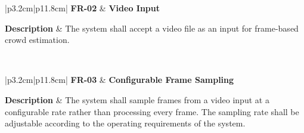 \begin{table}[H]
	\centering
	\renewcommand{\arraystretch}{1.25}
	\begin{tabular}{|p{3.2cm}|p{11.8cm}|}
		\hline
		\textbf{FR-02} &
		\textbf{Video Input} \\ \hline
		
		\textbf{Description} &
		The system shall accept a video file as an input for frame-based crowd estimation. \\ \hline
		
		 \\ \hline
	\end{tabular}
	\caption{Functional requirement for video input.}
	\label{tab:fr02}
\end{table}


\begin{table}[H]
	\centering
	\renewcommand{\arraystretch}{1.25}
	\begin{tabular}{|p{3.2cm}|p{11.8cm}|}
		\hline
		\textbf{FR-03} &
		\textbf{Configurable Frame Sampling} \\ \hline
		
		\textbf{Description} &
		The system shall sample frames from a video input at a configurable rate rather than processing every frame. The sampling rate shall be adjustable according to the operating requirements of the system. \\ \hline
		
		 \\ \hline
	\end{tabular}
	\caption{Functional requirement for configurable frame sampling.}
	\label{tab:fr03}
\end{table}


